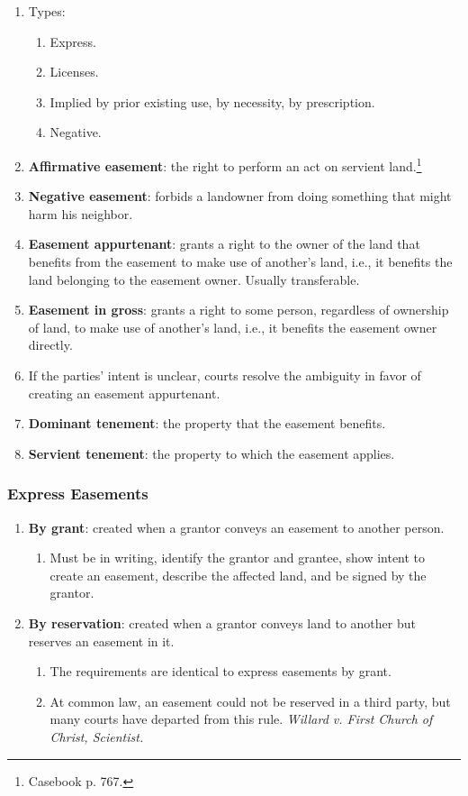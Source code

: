\begin{enumerate}
    \item Types:
    \begin{enumerate}
        \item Express.
        \item Licenses.
        \item Implied by prior existing use, by necessity, by prescription.
        \item Negative.
    \end{enumerate}
    \item \textbf{Affirmative easement}: the right to perform an act on 
    servient land.\footnote{Casebook p. 767.}
    \item \textbf{Negative easement}: forbids a landowner from doing something 
    that might harm his neighbor.
    \item \textbf{Easement appurtenant}: grants a right to the owner of the 
    land that benefits from the easement to make use of another's land, i.e., 
    it benefits the land belonging to the easement owner. Usually 
    transferable.
    \item \textbf{Easement in gross}: grants a right to some person, 
    regardless of ownership of land, to make use of another's land, i.e., it 
    benefits the easement owner directly. 
    \item If the parties' intent is unclear, courts resolve the ambiguity in 
    favor of creating an easement appurtenant.
    \item \textbf{Dominant tenement}: the property that the easement benefits.
    \item \textbf{Servient tenement}: the property to which the easement 
    applies.
\end{enumerate}

\subsubsection{Express Easements}

\begin{enumerate}
    \item \textbf{By grant}: created when a grantor conveys an easement to 
    another person. 
    \begin{enumerate}
        \item Must be in writing, identify the grantor and grantee, show 
        intent to create an easement, describe the affected land, and be 
        signed by the grantor.
    \end{enumerate}
    \item \textbf{By reservation}: created when a grantor conveys land to 
    another but reserves an easement in it.
    \begin{enumerate}
        \item The requirements are identical to express easements by grant.
        \item At common law, an easement could not be reserved in a third 
        party, but many courts have departed from this rule. \emph{Willard v. 
        First Church of Christ, Scientist.}
    \end{enumerate}
\end{enumerate}

